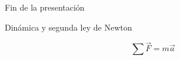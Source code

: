 \documentclass[aspectratio=169,11pt]{beamer}
\begin{document}
\begin{frame}

\centering
\vfill

{\Huge\color{azul}
Fin de la presentación\par}

\vspace{0.7cm}

{\Large
Dinámica y segunda ley de Newton\par}

\vspace{0.8cm}

{\LARGE\color{morado}
\[
\sum \vec{F}=m\vec{a}
\]
}

\vfill

\end{frame}
\end{document}
